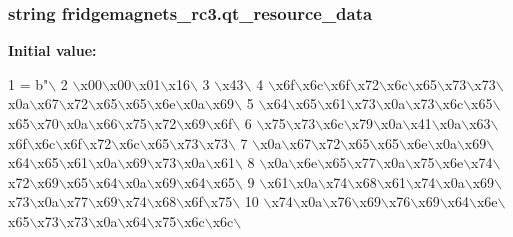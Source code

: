 \subsubsection[{qt\+\_\+resource\+\_\+data}]{\setlength{\rightskip}{0pt plus 5cm}string fridgemagnets\+\_\+rc3.\+qt\+\_\+resource\+\_\+data}\label{namespacefridgemagnets__rc3_a41f6c37444b169377a5cb861c9ef0701}
{\bfseries Initial value\+:}
\begin{DoxyCode}
1 = b\textcolor{stringliteral}{"\(\backslash\)}
2 \textcolor{stringliteral}{\(\backslash\)x00\(\backslash\)x00\(\backslash\)x01\(\backslash\)x16\(\backslash\)}
3 \textcolor{stringliteral}{\(\backslash\)x43\(\backslash\)}
4 \textcolor{stringliteral}{\(\backslash\)x6f\(\backslash\)x6c\(\backslash\)x6f\(\backslash\)x72\(\backslash\)x6c\(\backslash\)x65\(\backslash\)x73\(\backslash\)x73\(\backslash\)x0a\(\backslash\)x67\(\backslash\)x72\(\backslash\)x65\(\backslash\)x65\(\backslash\)x6e\(\backslash\)x0a\(\backslash\)x69\(\backslash\)}
5 \textcolor{stringliteral}{\(\backslash\)x64\(\backslash\)x65\(\backslash\)x61\(\backslash\)x73\(\backslash\)x0a\(\backslash\)x73\(\backslash\)x6c\(\backslash\)x65\(\backslash\)x65\(\backslash\)x70\(\backslash\)x0a\(\backslash\)x66\(\backslash\)x75\(\backslash\)x72\(\backslash\)x69\(\backslash\)x6f\(\backslash\)}
6 \textcolor{stringliteral}{\(\backslash\)x75\(\backslash\)x73\(\backslash\)x6c\(\backslash\)x79\(\backslash\)x0a\(\backslash\)x41\(\backslash\)x0a\(\backslash\)x63\(\backslash\)x6f\(\backslash\)x6c\(\backslash\)x6f\(\backslash\)x72\(\backslash\)x6c\(\backslash\)x65\(\backslash\)x73\(\backslash\)x73\(\backslash\)}
7 \textcolor{stringliteral}{\(\backslash\)x0a\(\backslash\)x67\(\backslash\)x72\(\backslash\)x65\(\backslash\)x65\(\backslash\)x6e\(\backslash\)x0a\(\backslash\)x69\(\backslash\)x64\(\backslash\)x65\(\backslash\)x61\(\backslash\)x0a\(\backslash\)x69\(\backslash\)x73\(\backslash\)x0a\(\backslash\)x61\(\backslash\)}
8 \textcolor{stringliteral}{\(\backslash\)x0a\(\backslash\)x6e\(\backslash\)x65\(\backslash\)x77\(\backslash\)x0a\(\backslash\)x75\(\backslash\)x6e\(\backslash\)x74\(\backslash\)x72\(\backslash\)x69\(\backslash\)x65\(\backslash\)x64\(\backslash\)x0a\(\backslash\)x69\(\backslash\)x64\(\backslash\)x65\(\backslash\)}
9 \textcolor{stringliteral}{\(\backslash\)x61\(\backslash\)x0a\(\backslash\)x74\(\backslash\)x68\(\backslash\)x61\(\backslash\)x74\(\backslash\)x0a\(\backslash\)x69\(\backslash\)x73\(\backslash\)x0a\(\backslash\)x77\(\backslash\)x69\(\backslash\)x74\(\backslash\)x68\(\backslash\)x6f\(\backslash\)x75\(\backslash\)}
10 \textcolor{stringliteral}{\(\backslash\)x74\(\backslash\)x0a\(\backslash\)x76\(\backslash\)x69\(\backslash\)x76\(\backslash\)x69\(\backslash\)x64\(\backslash\)x6e\(\backslash\)x65\(\backslash\)x73\(\backslash\)x73\(\backslash\)x0a\(\backslash\)x64\(\backslash\)x75\(\backslash\)x6c\(\backslash\)x6c\(\backslash\)}

\end{DoxyCode}
